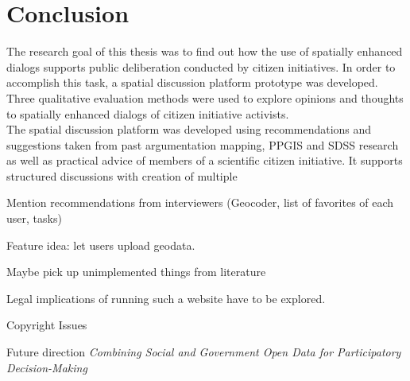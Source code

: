 \section{Conclusion}
\label{chap:conclusion}
The research goal of this thesis was to find out how the use of spatially enhanced dialogs supports public deliberation conducted by citizen initiatives. In order to accomplish this task, a spatial discussion platform prototype was developed. Three qualitative evaluation methods were used to explore opinions and thoughts to spatially enhanced dialogs of citizen initiative activists.\\
The spatial discussion platform was developed using recommendations and suggestions taken from past argumentation mapping, PPGIS and SDSS research as well as practical advice of members of a scientific citizen initiative. It supports structured discussions with creation of multiple 




Mention recommendations from interviewers (Geocoder, list of favorites of each user, tasks)

Feature idea: let users upload geodata.

Maybe pick up unimplemented things from literature

Legal implications of running such a website have to be explored.

Copyright Issues \cite{Carver2001_PPGIS_Cyberdemocracy}


Future direction \textit{Combining Social and Government Open Data for Participatory Decision-Making}
